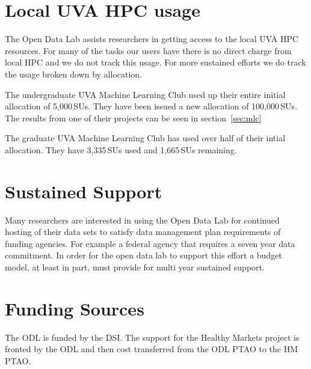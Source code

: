 \section{Local UVA HPC usage}
The Open Data Lab assists researchers in getting access to the local UVA HPC resources. For many of the tasks our users have there is no direct charge from local HPC and we do not track this usage. For more sustained efforts we do track the usage broken down by allocation.

The undergraduate UVA Machine Learning Club used up their entire initial allocation of 5,000\,SUs. They have been issued a new allocation of 100,000\,SUs. The results from one of their projects can be seen in section~\ref{sec:mlc}

The graduate UVA Machine Learning Club has used over half of their intial allocation. They have 3,335\,SUs used and 1,665\,SUs remaining.

\section{Sustained Support}
Many researchers are interested in using the Open Data Lab for continued hosting of their data sets to satisfy data management plan requirements of funding agencies. For example a federal agency that requires a seven year data commitment. In order for the open data lab to support this effort a budget model, at least in part, must provide for multi year sustained support.

\section{Funding Sources}
The ODL is funded by the DSI. The support for the Healthy Markets project is fronted by the ODL and then  cost transferred from the ODL PTAO to the HM PTAO.











